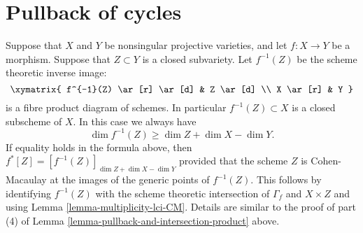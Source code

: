 \section{Pullback of cycles}
\label{section-pullback-cycles}

\noindent
Suppose that $X$ and $Y$ be nonsingular
projective varieties, and let $f : X \to Y$ be a morphism.
Suppose that $Z \subset Y$ is a closed subvariety. Let $f^{-1}(Z)$
be the scheme theoretic inverse image:
$$
\xymatrix{
f^{-1}(Z) \ar[r] \ar[d] & Z \ar[d] \\
X \ar[r] & Y
}
$$
is a fibre product diagram of schemes. In particular $f^{-1}(Z) \subset X$
is a closed subscheme of $X$. In this case we always have
$$
\dim f^{-1}(Z) \geq \dim Z + \dim X - \dim Y.
$$
If equality holds in the formula above, then
$f^*[Z] = [f^{-1}(Z)]_{\dim Z + \dim X - \dim Y}$
provided that the scheme $Z$ is Cohen-Macaulay at the images
of the generic points of $f^{-1}(Z)$. This follows by identifying
$f^{-1}(Z)$ with the scheme theoretic intersection of $\Gamma_f$
and $X \times Z$ and using Lemma \ref{lemma-multiplicity-lci-CM}.
Details are similar to the proof of part (4) of
Lemma \ref{lemma-pullback-and-intersection-product} above.











